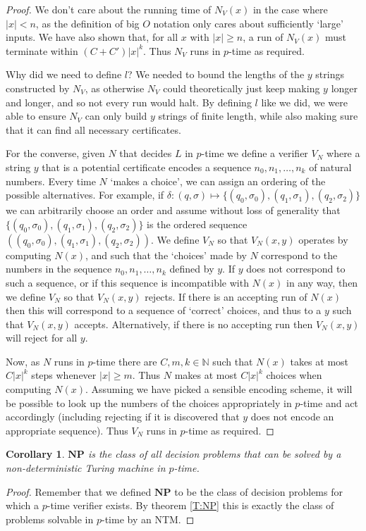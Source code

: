 \documentclass{article}
\theoremstyle{plain}
\newtheorem{corollary}[theorem]{Corollary}{\bfseries}{\upshape}
\theoremstyle{definition}
\newcommand{\NP}{\mathbf{NP}}
\newcommand{\bbN}{\mathbb{N}}
\begin{document}
\begin{proof}
We don't care about the running time of $N_V(x)$ in the case where $|x|< n$, as the definition of big $O$ notation only cares about sufficiently `large' inputs. We have also shown that, for all $x$ with $|x|\geq n$, a run of $N_V(x)$ must terminate within $(C+C')|x|^k$. Thus $N_V$ runs in $p$-time as required.

Why did we need to define $l$? We needed to bound the lengths of the $y$ strings constructed by $N_V$, as otherwise $N_V$ could theoretically just keep making $y$ longer and longer, and so not every run would halt. By defining $l$ like we did, we were able to ensure $N_V$ can only build $y$ strings of finite length, while also making sure that it can find all necessary certificates.         

For the converse, given $N$ that decides $L$ in $p$-time we define a verifier $V_N$ where a string $y$ that is a potential certificate encodes a sequence $n_0,n_1,\ldots,n_k$ of natural numbers. Every time $N$ `makes a choice', we can assign an ordering of the possible alternatives. For example, if $\delta:(q,\sigma)\mapsto \{(q_0,\sigma_0), (q_1,\sigma_1), (q_2,\sigma_2)\}$ we can arbitrarily choose an order and assume without loss of generality that $\{(q_0,\sigma_0), (q_1,\sigma_1), (q_2,\sigma_2)\}$ is the ordered sequence $((q_0,\sigma_0), (q_1,\sigma_1), (q_2,\sigma_2))$. We define $V_N$ so that $V_N(x,y)$ operates by computing $N(x)$, and such that the `choices' made by $N$ correspond to the numbers in the sequence $n_0,n_1,\ldots,n_k$ defined by $y$. If $y$ does not correspond to such a sequence, or if this sequence is incompatible with $N(x)$ in any way, then we define $V_N$ so that $V_N(x,y)$ rejects. If there is an accepting run of $N(x)$ then this will correspond to a sequence of `correct' choices, and thus to a $y$ such that $V_N(x,y)$ accepts. Alternatively, if there is no accepting run then $V_N(x,y)$ will reject for all $y$.

Now, as $N$ runs in $p$-time there are $C,m,k\in \bbN$ such that $N(x)$ takes at most $C|x|^k$ steps whenever $|x|\geq m$. Thus $N$ makes at most $C|x|^k$ choices when computing $N(x)$. Assuming we have picked a sensible encoding scheme, it will be possible to look up the numbers of the choices appropriately in $p$-time and act accordingly (including rejecting if it is discovered that $y$ does not encode an appropriate sequence). Thus $V_N$ runs in $p$-time as required.
\end{proof}

\begin{corollary}
$\NP$ is the class of all decision problems that can be solved by a non-deterministic Turing machine in $p$-time.
\end{corollary}
\begin{proof}
Remember that we defined $\NP$ to be the class of decision problems for which a $p$-time verifier exists. By theorem \ref{T:NP} this is exactly the class of problems solvable in $p$-time by an NTM.
\end{proof} 
\end{document}
